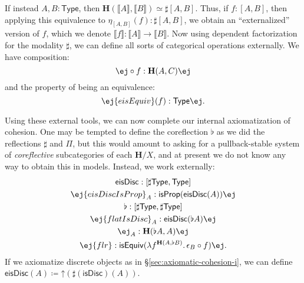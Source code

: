 \documentclass[copyright,12pt]{eptcs}
\makeatletter
\newcommand{\type}{\ensuremath{\mathsf{Type}}\xspace}
\renewcommand{\H}{\ensuremath{\mathbf{H}}\xspace}
\newcommand{\esc}{\ensuremath{\mathord{\uparrow}}}
\def\jd#1{\@jd#1\ej}
\def\@jd#1|-#2\ej{\@@jd#1,,\;\vdash\;\left(#2\right)}
\def\@@jd#1,{\@ifmtarg{#1}{\let\next=\relax}{\left(#1\right)\let\next=\@@@jd}\next}
\def\@@@jd#1,{\@ifmtarg{#1}{\let\next=\relax}{,\,\left(#1\right)\let\next=\@@@jd}\next}
\def\cm{,}
\makeatother
\begin{document}
If instead $A,B:\type$, then $\H(\llbracket A\rrbracket, \llbracket B\rrbracket) \simeq \sharp[A,B]$.
Thus, if $f:[A,B]$, then applying this equivalence to $\eta_{[A,B]}(f): \sharp[A,B]$, we obtain an ``externalized'' version of $f$, which we denote $\llbracket f \rrbracket : \llbracket A\rrbracket \to \llbracket B\rrbracket$.
Now using dependent factorization for the modality $\sharp$, we can define all sorts of categorical operations externally.
We have composition:
\begin{equation*}
  \jd{A\cm B \cm C:\sharp\type, f:{\H(A, B)}, g:{\H(B, C)} |- g \circ f : \H(A,C)}
\end{equation*}
and the property of being an equivalence:
\[ \jd{A\cm B:\sharp \type, f:{\H(A,B)} |- \mathsf{eisEquiv}(f) : \type}. \]

Using these external tools, we can now complete our internal axiomatization of cohesion.
One may be tempted to define the coreflection $\flat$ as we did the reflections $\sharp$ and $\Pi$, but
this would amount to asking for a pullback-stable system of \emph{coreflective} subcategories of each $\H/X$, and at present we do not know any way to obtain this in models.
Instead, we work externally:
\begin{gather}
  \mathsf{eisDisc} : [\sharp\type,\type]\\
  \jd{A:\sharp\type |- \mathsf{eisDiscIsProp}_A : \mathsf{isProp}(\mathsf{eisDisc}(A))}\\
  \flat:[\sharp\type,\sharp\type]\\
  \jd{A:\sharp\type |- \mathsf{flatIsDisc}_A : \mathsf{eisDisc}(\flat A)}\\
  \jd{A:\sharp \type |- \epsilon_A : \H(\flat A, A)}\label{flatCounit}\\
  \jd{A\cm B:\sharp \type, \mathsf{ad} : \mathsf{eisDisc}(A) |-
    \mathsf{flr} : \mathsf{isEquiv}(\lambda f^{{\H(A,\flat B)}} . \, \epsilon_B \circ f)}.\label{eq:flatUniv}
\end{gather}
If we axiomatize discrete objects
as in \S\ref{sec:axiomatic-cohesion-i}, we can define
$\mathsf{eisDisc}(A) \coloneqq \esc(\sharp(\mathsf{isDisc})(A))$.
\end{document}
